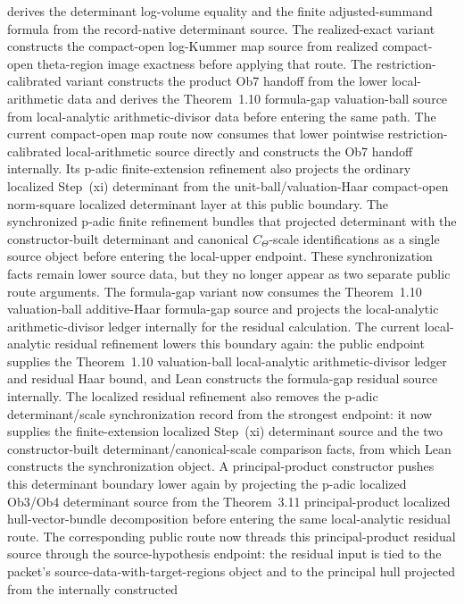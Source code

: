 \documentclass[11pt]{article}
\theoremstyle{plain}
\theoremstyle{definition}
\theoremstyle{remark}
\begin{document}
derives the determinant log-volume equality and the finite adjusted-summand
formula from the record-native determinant source.  The realized-exact variant
constructs the compact-open log-Kummer map source from realized compact-open
theta-region image exactness before applying that route.  The
restriction-calibrated variant constructs the product Ob7 handoff from the
lower local-arithmetic data and derives the Theorem~1.10 formula-gap
valuation-ball source from local-analytic arithmetic-divisor data before
entering the same path.  The current compact-open map route now consumes that
lower pointwise restriction-calibrated local-arithmetic source directly and
constructs the Ob7 handoff internally.  Its p-adic finite-extension refinement also projects
the ordinary localized Step~(xi) determinant from the unit-ball/valuation-Haar
compact-open norm-square localized determinant layer at this public boundary.
The synchronized p-adic finite refinement bundles that projected determinant
with the constructor-built determinant and canonical \(C_\Theta\)-scale
identifications as a single source object before entering the local-upper
endpoint.  These synchronization facts remain lower source data, but they no
longer appear as two separate public route arguments.  The formula-gap variant
now consumes the Theorem~1.10 valuation-ball additive-Haar formula-gap source
and projects the local-analytic arithmetic-divisor ledger internally for the
residual calculation.  The current local-analytic residual refinement lowers
this boundary again: the public endpoint supplies the Theorem~1.10
valuation-ball local-analytic arithmetic-divisor ledger and residual Haar
bound, and Lean constructs the formula-gap residual source internally.  The
localized residual refinement also removes the p-adic determinant/scale
synchronization record from the strongest endpoint: it now supplies the
finite-extension localized Step~(xi) determinant source and the two
constructor-built determinant/canonical-scale comparison facts, from which Lean
constructs the synchronization object.  A principal-product constructor pushes
this determinant boundary lower again by projecting the p-adic localized
Ob3/Ob4 determinant source from the Theorem~3.11 principal-product localized
hull-vector-bundle decomposition before entering the same local-analytic
residual route.  The corresponding public route now threads this
principal-product residual source through the source-hypothesis endpoint: the
residual input is tied to the packet's source-data-with-target-regions object
and to the principal hull projected from the internally constructed
\end{document}

